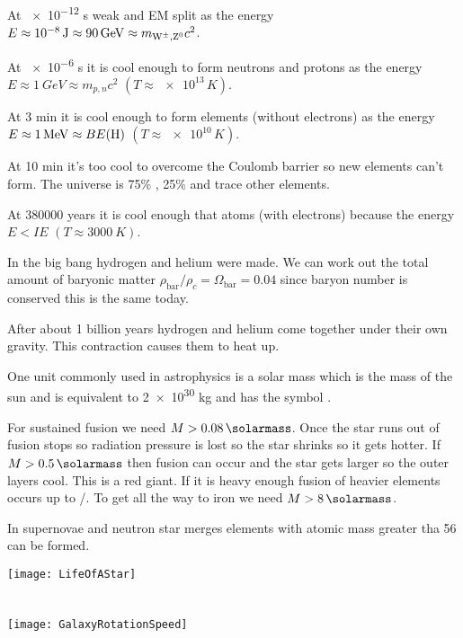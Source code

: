 At \num{e-12} \si{s} weak and EM split as the energy \(E \approx \SI{e-8}{\joule} \approx \SI{90}{GeV} \approx m_{\mathrm{W^\pm},\mathrm{Z^0}}c^2\).

At \num{e-6} \si{s} it is cool enough to form neutrons and protons as the energy \(E\approx\SI{1}{GeV}\approx m_{p,n}c^2\) \((T\approx\num{e13}\,\si{K})\).

At 3 min it is cool enough to form elements (without electrons) as the energy \(E \approx \SI{1}{MeV} \approx BE(\ce{H})\) \((T\approx\num{e10}\,\si{K})\).

At 10 min it's too cool to overcome the Coulomb barrier so new elements can't form. The universe is 75\% , 25\%  and trace other elements.

At \num{380000} years it is cool enough that atoms (with electrons) because the energy \(E < IE\) \((T\approx\SI{3000}{K})\).

In the big bang hydrogen and helium were made. We can work out the total amount of baryonic matter \(\rho_{\mathrm{bar}}/\rho_c = \Omega_{\mathrm{bar}} = 0.04\) since baryon number is conserved this is the same today.

After about 1 billion years hydrogen and helium come together under their own gravity. This contraction causes them to heat up.

One unit commonly used in astrophysics is a solar mass which is the mass of the sun and is equivalent to \num{2e30} \si{kg} and has the symbol \si{\solarmass}.

For sustained  fusion we need \(M>\SI{0.08}{\solarmass}\). Once the star runs out of  fusion stops so radiation pressure is lost so the star shrinks so it gets hotter. If \(M>\SI{0.5}{\solarmass}\) then  fusion can occur and the star gets larger so the outer layers cool. This is a red giant. If it is heavy enough fusion of heavier elements occurs up to /. To get all the way to iron we need \(M>\SI{8}{\solarmass}\).

In supernovae and neutron star merges elements with atomic mass greater tha 56 can be formed.

\begin{center}
\texttt{[image: LifeOfAStar]}
\end{center}

\section{}

\begin{center}
\texttt{[image: GalaxyRotationSpeed]}
\end{center}


